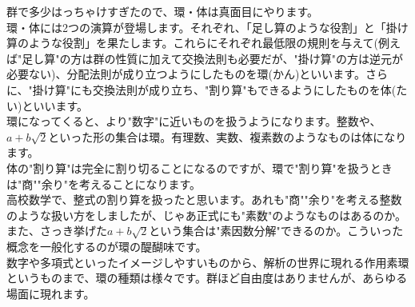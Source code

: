 
群で多少はっちゃけすぎたので、環・体は真面目にやります。\\
環・体には2つの演算が登場します。それぞれ、「足し算のような役割」と「掛け算のような役割」を果たします。これらにそれぞれ最低限の規則を与えて(例えば"足し算"の方は群の性質に加えて交換法則も必要だが、"掛け算"の方は逆元が必要ない)、分配法則が成り立つようにしたものを環(かん)といいます。さらに、"掛け算"にも交換法則が成り立ち、"割り算"もできるようにしたものを体(たい)といいます。\\
環になってくると、より"数字"に近いものを扱うようになります。整数や、$a + b\sqrt{2}$といった形の集合は環。有理数、実数、複素数のようなものは体になります。\\


体の"割り算"は完全に割り切ることになるのですが、環で"割り算"を扱うときは"商""余り"を考えることになります。\\
高校数学で、整式の割り算を扱ったと思います。あれも"商""余り"を考える整数のような扱い方をしましたが、じゃあ正式にも"素数"のようなものはあるのか。また、さっき挙げた$a + b\sqrt{2}$という集合は"素因数分解"できるのか。こういった概念を一般化するのが環の醍醐味です。\\
数字や多項式といったイメージしやすいものから、解析の世界に現れる作用素環というものまで、環の種類は様々です。群ほど自由度はありませんが、あらゆる場面に現れます。

